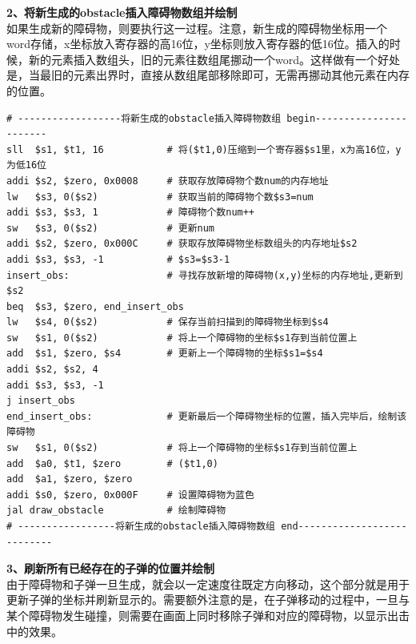 \textbf{2、将新生成的obstacle插入障碍物数组并绘制}\\
如果生成新的障碍物，则要执行这一过程。注意，新生成的障碍物坐标用一个word存储，x坐标放入寄存器的高16位，y坐标则放入寄存器的低16位。插入的时候，新的元素插入数组头，旧的元素往数组尾挪动一个word。这样做有一个好处是，当最旧的元素出界时，直接从数组尾部移除即可，无需再挪动其他元素在内存的位置。\\

\begin{lstlisting}[frame=shadowbox]
# ------------------将新生成的obstacle插入障碍物数组 begin-----------------------
sll  $s1, $t1, 16           # 将($t1,0)压缩到一个寄存器$s1里，x为高16位，y为低16位
addi $s2, $zero, 0x0008     # 获取存放障碍物个数num的内存地址
lw   $s3, 0($s2)            # 获取当前的障碍物个数$s3=num
addi $s3, $s3, 1            # 障碍物个数num++
sw   $s3, 0($s2)            # 更新num
addi $s2, $zero, 0x000C     # 获取存放障碍物坐标数组头的内存地址$s2
addi $s3, $s3, -1           # $s3=$s3-1
insert_obs:                 # 寻找存放新增的障碍物(x,y)坐标的内存地址,更新到$s2
beq  $s3, $zero, end_insert_obs
lw   $s4, 0($s2)            # 保存当前扫描到的障碍物坐标到$s4
sw   $s1, 0($s2)            # 将上一个障碍物的坐标$s1存到当前位置上
add  $s1, $zero, $s4        # 更新上一个障碍物的坐标$s1=$s4
addi $s2, $s2, 4
addi $s3, $s3, -1
j insert_obs
end_insert_obs:             # 更新最后一个障碍物坐标的位置，插入完毕后，绘制该障碍物
sw   $s1, 0($s2)            # 将上一个障碍物的坐标$s1存到当前位置上
add  $a0, $t1, $zero        # ($t1,0)
add  $a1, $zero, $zero
addi $s0, $zero, 0x000F     # 设置障碍物为蓝色
jal draw_obstacle           # 绘制障碍物
# -----------------将新生成的obstacle插入障碍物数组 end---------------------------
\end{lstlisting}

\textbf{3、刷新所有已经存在的子弹的位置并绘制}\\
由于障碍物和子弹一旦生成，就会以一定速度往既定方向移动，这个部分就是用于更新子弹的坐标并刷新显示的。需要额外注意的是，在子弹移动的过程中，一旦与某个障碍物发生碰撞，则需要在画面上同时移除子弹和对应的障碍物，以显示出击中的效果。\\


